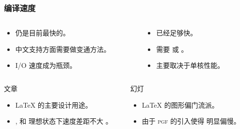 \begin{frame}
  \frametitle{编译速度}
  \begin{columns}
    \begin{column}{0.5\textwidth}
      \begin{exampleblock}{\faWindows}
        \begin{itemize}
          \item {} 仍是目前最快的。
          \item 中文支持方面需要做变通方法。
          \item I/O 速度成为瓶颈。
        \end{itemize}
      \end{exampleblock}
    \end{column}
    \begin{column}{0.5\textwidth}
      \begin{exampleblock}{\faLinux{} \faApple}
        \begin{itemize}
          \item {} 已经足够快。
          \item \CTeX{} 需要  或 。
          \item 主要取决于单核性能。
        \end{itemize}
      \end{exampleblock}
    \end{column}
  \end{columns}
  \begin{columns}
    \begin{column}{0.5\textwidth}
      \begin{block}{文章}
        \begin{itemize}
          \item \LaTeX{} 的主要设计用途。
          \item {},  和  理想状态下速度差距不大 。
        \end{itemize}
      \end{block}
    \end{column}
    \begin{column}{0.5\textwidth}
      \begin{block}{幻灯}
        \begin{itemize}
          \item \LaTeX{} 的图形偏门流派。
          \item 由于 \textsc{pgf} 的引入使得  明显偏慢。
        \end{itemize}
      \end{block}
    \end{column}
  \end{columns}


\end{frame}

